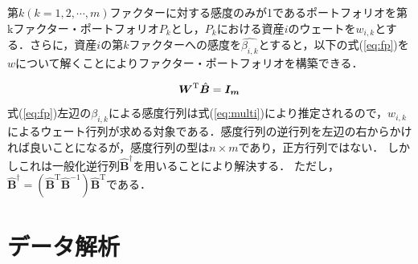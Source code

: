 ﻿\documentclass[11pt]{jreport}
\begin{document}
第$k(k=1,2,\cdots,m)$ファクターに対する感度のみが1であるポートフォリオを第kファクター・ポートフォリオ$P_k$とし，$P_k$における資産$i$のウェートを$w_{i,k}$とする．さらに，資産$i$の第$k$ファクターへの感度を$\hat{\beta_{i,k}}$とすると，以下の式(\ref{eq:fp})を\mbox{\boldmath $w$}について解くことによりファクター・ポートフォリオを構築できる．



\begin{equation}
\mbox{\boldmath $W$}^\text{T} \hat{\bm{B}} = \mbox{\boldmath $I_m$}
\label{eq:fp}
\end{equation}
式(\ref{eq:fp})左辺の$\beta_{i,k}$による感度行列は式(\ref{eq:multi})により推定されるので，$w_{i,k}$によるウェート行列が求める対象である．感度行列の逆行列を左辺の右からかければ良いことになるが，感度行列の型は$n\times m$であり，正方行列ではない．
しかしこれは一般化逆行列$\hat{\bm{B}}^\dag$を用いることにより解決する．
ただし，$\hat{\bm{B}}^\dag = (\hat{\bm{B}}^\text{T}\hat{\bm{B}}^{-1})\hat{\bm{B}}^\text{T}$である．







\chapter{データ解析}
\end{document}

